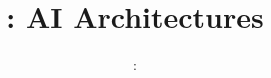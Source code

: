\usepackage{../../beamerthemeFalmouthGamesAcademy}
\usepackage{multimedia}
\graphicspath{ {../../} }


\usepackage[normalem]{ulem}
\usepackage{wasysym}

\usepackage{pifont}%
\newcommand{\cmark}{\ding{51}}%
\newcommand{\xmark}{\ding{55}}%

\usepackage{pdfpages}

\usepackage{algpseudocode}
\usepackage{qtree}




\title{\sessionnumber: AI Architectures}
\subtitle{\modulecode: \moduletitle}

\frame{\titlepage} 








